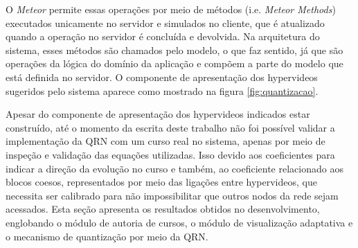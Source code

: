 O \textit{Meteor} permite essas operações por meio de métodos (i.e. \textit{Meteor Methods}) executados unicamente no servidor e simulados no cliente, que é atualizado quando a operação no servidor é concluída e devolvida. Na arquitetura do sistema, esses métodos são chamados pelo modelo, o que faz sentido, já que são operações da lógica do domínio da aplicação e compõem a parte do modelo que está definida no servidor. O componente de apresentação dos hypervideos sugeridos pelo sistema aparece como mostrado na figura \ref{fig:quantizacao}.

Apesar do componente de apresentação dos hypervideos indicados estar construído, até o momento da escrita deste trabalho não foi possível validar a implementação da QRN com um curso real no sistema, apenas por meio de inspeção e validação das equações utilizadas. Isso devido aos coeficientes para indicar a direção da evolução no curso e também, ao coeficiente relacionado aos blocos coesos, representados por meio das ligações entre hypervideos, que necessita ser calibrado para não impossibilitar que outros nodos da rede sejam acessados.
Esta seção apresenta os resultados obtidos no desenvolvimento, englobando o módulo de autoria de cursos, o módulo de visualização adaptativa e o mecanismo de quantização por meio da QRN.